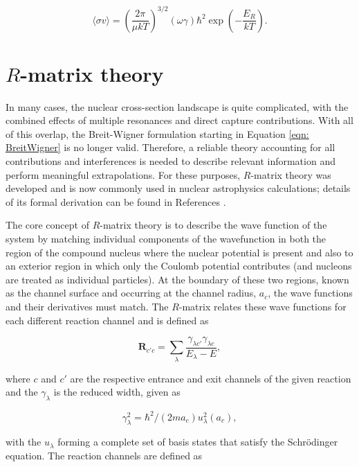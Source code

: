 \begin{equation}
\langle \sigma v \rangle = \left(  \dfrac{2 \pi}{\mu k T} \right)^{3/2} (\omega \gamma) \hbar^{2} \exp \left( - \dfrac{E_{R}}{k T} \right).
\end{equation}



\section{$R$-matrix theory}
\label{sec: r-matrix}

In many cases, the nuclear cross-section landscape is quite complicated, with the combined effects of multiple resonances and direct capture contributions. With all of this overlap, the Breit-Wigner formulation starting in Equation \ref{eqn: BreitWigner} is no longer valid. Therefore, a reliable theory accounting for all contributions and interferences is needed to describe relevant information and perform meaningful extrapolations. For these purposes, $R$-matrix theory was developed and is now commonly used in nuclear astrophysics calculations; details of its formal derivation can be found in References \cite{Lane1958, Azuma2010}. 

The core concept of $R$-matrix theory is to describe the wave function of the system by matching individual components of the wavefunction in both the region of the compound nucleus where the nuclear potential is present and also to an exterior region in which only the Coulomb potential contributes (and nucleons are treated as individual particles). At the boundary of these two regions, known as the channel surface and occurring at the channel radius, $a_{c}$, the wave functions and their derivatives must match. The $R$-matrix relates these wave functions for each different reaction channel and is defined as

\begin{equation}
\mathbf{R}_{c' c} =  \sum_\lambda \frac{\gamma_{\lambda c'}\gamma_{\lambda c}}{E_\lambda-E},
\label{eqn: Rmatrix}
\end{equation}

\noindent where $c$ and $c'$ are the respective entrance and exit channels of the given reaction and the $\gamma_{\lambda}$ is the reduced width, given as

\begin{equation}
\gamma_\lambda^2 = \hbar^2/(2m a_c)u_\lambda^2(a_c),
\end{equation}

\noindent with the $u_{\lambda}$ forming a complete set of basis states that satisfy the Schr\"odinger  equation. The reaction channels are defined as 


